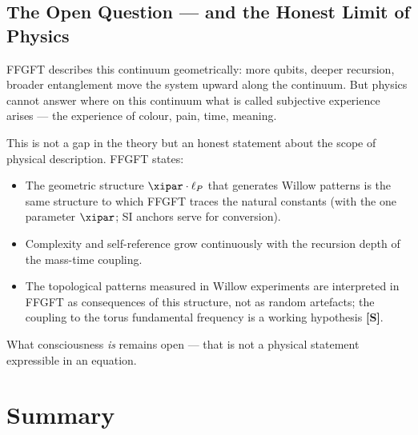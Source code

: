 \subsection{The Open Question — and the Honest Limit of Physics}

FFGFT describes this continuum geometrically: more qubits, deeper recursion, broader
entanglement move the system upward along the continuum. But physics cannot answer
where on this continuum what is called subjective experience arises — the experience
of colour, pain, time, meaning.

This is not a gap in the theory but an honest statement about the scope of physical
description. FFGFT states:

\begin{conclusionBox}
\begin{itemize}
    \item The geometric structure $\xipar \cdot \ell_P$ that generates Willow patterns
    is the same structure to which FFGFT traces the natural constants
    (with the one parameter $\xipar$; SI anchors serve for conversion).
    \item Complexity and self-reference grow continuously with the recursion depth of
    the mass-time coupling.
    \item The topological patterns measured in Willow experiments are interpreted in FFGFT
    as consequences of this structure, not as random artefacts; the coupling to the
    torus fundamental frequency is a working hypothesis \textbf{[S]}.
\end{itemize}
What consciousness \textit{is} remains open — that is not a physical statement
expressible in an equation.
\end{conclusionBox}


\section{Summary}

